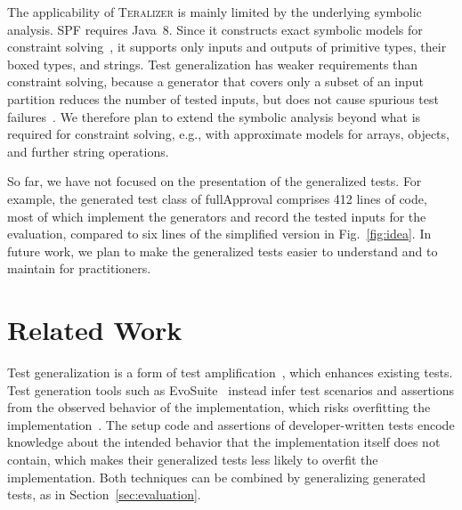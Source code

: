 \documentclass[10pt,conference]{IEEEtran}
\newcommand{\Teralizer}{\textsc{Teralizer}}
\newcommand{\codefont}{\fontfamily{lmtt}\selectfont}
\newcommand{\code}[1]{{\codefont #1}}
\begin{document}
The applicability of \Teralizer{} is mainly limited by the underlying symbolic analysis.
SPF requires Java~8.
Since it constructs exact symbolic models for constraint solving~\cite{pasareanu_2013_symbolic}, it supports only inputs and outputs of primitive types, their boxed types, and strings.
Test generalization has weaker requirements than constraint solving, because a generator that covers only a subset of an input partition reduces the number of tested inputs, but does not cause spurious test failures~\cite{glock_2025_teralizer}.
We therefore plan to extend the symbolic analysis beyond what is required for constraint solving, e.g., with approximate models for arrays, objects, and further string operations.

So far, we have not focused on the presentation of the generalized tests.
For example, the generated test class of \code{fullApproval} comprises 412 lines of code, most of which implement the generators and record the tested inputs for the evaluation, compared to six lines of the simplified version in Fig.~\ref{fig:idea}.
In future work, we plan to make the generalized tests easier to understand and to maintain for practitioners.

\section{Related Work}
\label{sec:related-work}

Test generalization is a form of test amplification~\cite{danglot_2019_snowballing}, which enhances existing tests.
Test generation tools such as EvoSuite~\cite{fraser_2011_evosuite} instead infer test scenarios and assertions from the observed behavior of the implementation, which risks overfitting the implementation~\cite{barr_2015_oracle}.
The setup code and assertions of developer-written tests encode knowledge about the intended behavior that the implementation itself does not contain, which makes their generalized tests less likely to overfit the implementation.
Both techniques can be combined by generalizing generated tests, as in Section~\ref{sec:evaluation}.
\end{document}
